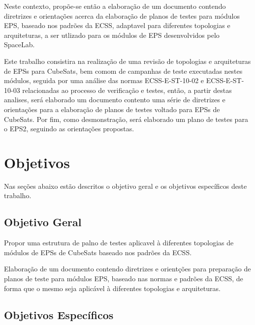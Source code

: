 Neste contexto, propõe-se então a elaboração de um documento contendo diretrizes e orientações acerca da elaboração de planos de testes para módulos \gls{EPS}, baseado nos padrões da \gls{ECSS}, adaptavel para diferentes topologias e arquiteturas, a ser utlizado para os módulos de \gls{EPS} desenvolvidos pelo SpaceLab.

Este trabalho consistira na realização de uma revisão de topologias e arquiteturas de EPSs para CubeSats, bem comom de campanhas de teste executadas nestes módulos, seguida por uma análise das normas ECSS-E-ST-10-02 \cite{ecss-e-st-10-02} e ECSS-E-ST-10-03 \cite{ecss-e-st-10-03} relacionadas ao processo de verificação e testes, então, a partir destas analises, será elaborado um documento contento uma série de diretrizes e orientações para a elaboração de planos de testes voltado para EPSs de CubeSats. Por fim, como desmonstração, será elaborado um plano de testes para o \gls{EPS2}, seguindo as orientações propostas.

\section{Objetivos}\label{sec:objetivos}

Nas seções abaixo estão descritos o objetivo geral e os objetivos específicos deste trabalho.

\subsection{Objetivo Geral}

Propor uma estrutura de palno de testes aplicavel à diferentes topologias de módulos de \gls{EPS}s de CubeSats baseado nos padrões da \gls{ECSS}.

Elaboração de um documento contendo diretrizes e orientções para preparação de planos de teste para módulos \gls{EPS}, baseado nas normas e padrões da \gls{ECSS}, de forma que o mesmo seja aplicável à diferentes topologias e arquiteturas.

\subsection{Objetivos Específicos}

